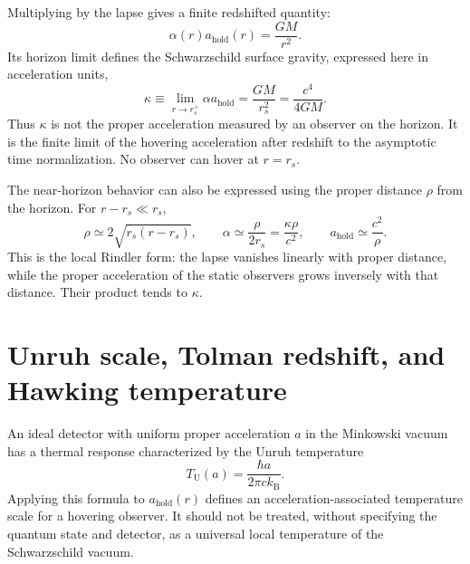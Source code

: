 \documentclass[12pt]{article}
\begin{document}
Multiplying by the lapse gives a finite redshifted quantity:
\begin{equation}
  \alpha(r)a_{\mathrm{hold}}(r)=\frac{GM}{r^2}.
  \label{eq:redshifted-acceleration}
\end{equation}
Its horizon limit defines the Schwarzschild surface gravity, expressed here in acceleration units,
\begin{equation}
  \kappa\equiv\lim_{r\to r_s^+}\alpha a_{\mathrm{hold}}
  =\frac{GM}{r_s^2}
  =\frac{c^4}{4GM}.
  \label{eq:surface-gravity}
\end{equation}
Thus $\kappa$ is not the proper acceleration measured by an observer on the horizon. It is the finite limit of the hovering acceleration after redshift to the asymptotic time normalization. No observer can hover at $r=r_s$.

The near-horizon behavior can also be expressed using the proper distance $\rho$ from the horizon. For $r-r_s\ll r_s$,
\begin{equation}
  \rho\simeq2\sqrt{r_s(r-r_s)},
  \qquad
  \alpha\simeq\frac{\rho}{2r_s}=\frac{\kappa\rho}{c^2},
  \qquad
  a_{\mathrm{hold}}\simeq\frac{c^2}{\rho}.
  \label{eq:near-horizon-rindler}
\end{equation}
This is the local Rindler form: the lapse vanishes linearly with proper distance, while the proper acceleration of the static observers grows inversely with that distance. Their product tends to $\kappa$.

\section{Unruh scale, Tolman redshift, and Hawking temperature}

An ideal detector with uniform proper acceleration $a$ in the Minkowski vacuum has a thermal response characterized by the Unruh temperature \cite{Unruh}
\begin{equation}
  T_{\mathrm U}(a)=\frac{\hbar a}{2\pi c k_{\mathrm B}}.
  \label{eq:unruh-temperature}
\end{equation}
Applying this formula to $a_{\mathrm{hold}}(r)$ defines an acceleration-associated temperature scale for a hovering observer. It should not be treated, without specifying the quantum state and detector, as a universal local temperature of the Schwarzschild vacuum.
\end{document}
